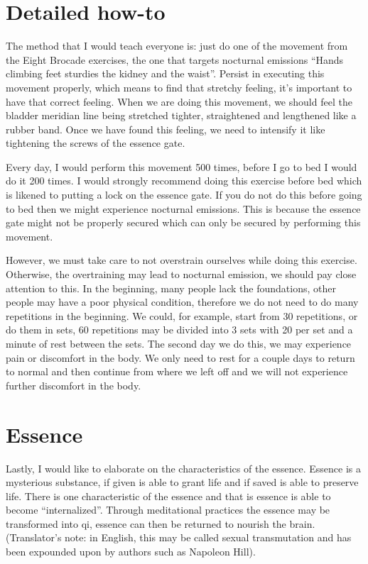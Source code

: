 \documentclass[
]{book}
\begin{document}
\hypertarget{detailed-how-to}{%
\section{Detailed how-to}\label{detailed-how-to}}

The method that I would teach everyone is: just do one of the movement from the Eight Brocade exercises, the one that targets nocturnal emissions ``Hands climbing feet sturdies the kidney and the waist''. Persist in executing this movement properly, which means to find that stretchy feeling, it's important to have that correct feeling. When we are doing this movement, we should feel the bladder meridian line being stretched tighter, straightened and lengthened like a rubber band. Once we have found this feeling, we need to intensify it like tightening the screws of the essence gate.

Every day, I would perform this movement 500 times, before I go to bed I would do it 200 times. I would strongly recommend doing this exercise before bed which is likened to putting a lock on the essence gate. If you do not do this before going to bed then we might experience nocturnal emissions. This is because the essence gate might not be properly secured which can only be secured by performing this movement.

However, we must take care to not overstrain ourselves while doing this exercise. Otherwise, the overtraining may lead to nocturnal emission, we should pay close attention to this. In the beginning, many people lack the foundations, other people may have a poor physical condition, therefore we do not need to do many repetitions in the beginning. We could, for example, start from 30 repetitions, or do them in sets, 60 repetitions may be divided into 3 sets with 20 per set and a minute of rest between the sets. The second day we do this, we may experience pain or discomfort in the body. We only need to rest for a couple days to return to normal and then continue from where we left off and we will not experience further discomfort in the body.

\hypertarget{essence}{%
\section{Essence}\label{essence}}

Lastly, I would like to elaborate on the characteristics of the essence. Essence is a mysterious substance, if given is able to grant life and if saved is able to preserve life. There is one characteristic of the essence and that is essence is able to become ``internalized''. Through meditational practices the essence may be transformed into qi, essence can then be returned to nourish the brain. (Translator's note: in English, this may be called sexual transmutation and has been expounded upon by authors such as Napoleon Hill).
\end{document}
